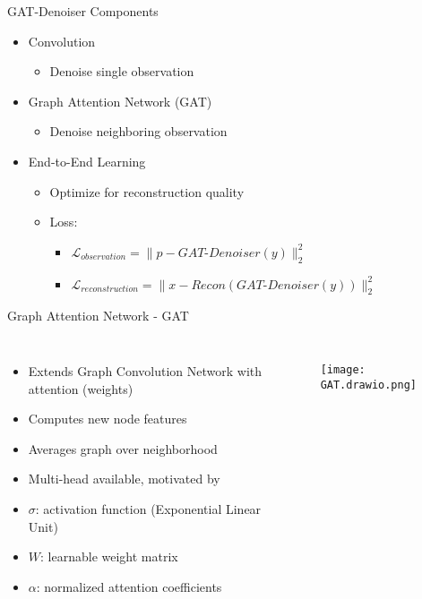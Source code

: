 \begin{frame}{GAT-Denoiser Components}
    
  \begin{itemize}
    \item<2-> Convolution
    \begin{itemize}
      \item Denoise single observation
    \end{itemize}

    \item<3-> Graph Attention Network (GAT) \cite{GAT}
    \begin{itemize}
      \item Denoise neighboring  observation
    \end{itemize}
    \item<4-> End-to-End Learning
    \begin{itemize}
      \item Optimize for reconstruction quality
      \item Loss:
      \begin{itemize}
        \item<5-> $\mathcal{L}_{observation} = \parallel p - \textit{GAT-Denoiser}(y) \parallel ^2_2 $
        \item<6-> \alert{$\mathcal{L}_{reconstruction} = \parallel x - \textit{Recon} ( \textit{GAT-Denoiser}(y)) \parallel ^2_2$}
      \end{itemize}
      
      
    \end{itemize}
  \end{itemize}

\end{frame}

\begin{frame}{Graph Attention Network - GAT}
  \pause
  \begin{columns}
    \begin{itemize}
      \item Extends Graph Convolution Network with attention (weights)
      \item Computes new node features
      \item Averages graph over neighborhood
      \item Multi-head available, motivated by \cite{transformer}
      \item<3> \alert<3>{$\sigma$: activation function (Exponential Linear Unit)}
      \item<3> \alert<3>{$W$: learnable weight matrix}
      \item<3> \alert<3>{$\alpha$: normalized attention coefficients}
    \end{itemize}
    \begin{figure}
      \texttt{[image: GAT.drawio.png]}
    \end{figure}
    
  \end{columns}

\end{frame}


